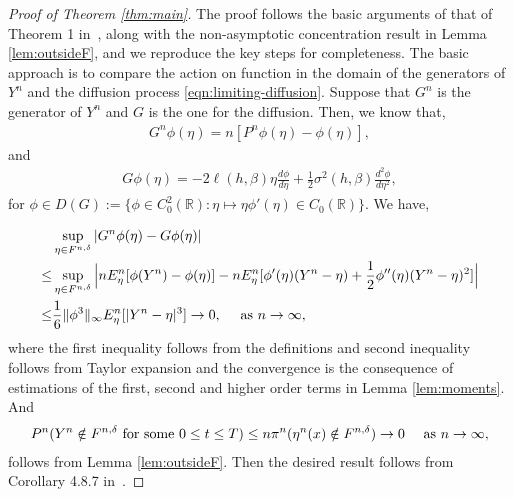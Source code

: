 \documentclass{amsart}
\newcommand{\Real}{\mathbb R}
\begin{document}
         
         \begin{proof}[Proof of Theorem \ref{thm:main}]
         	The proof follows the basic arguments of that of Theorem 1 in~\cite{bierkens2017}, along with the non-asymptotic concentration result in Lemma \ref{lem:outsideF}, and we reproduce the key steps for completeness. The basic approach is to compare the action on function in the domain of the generators of $Y^n$ and 
         	the diffusion process \eqref{eqn:limiting-diffusion}. Suppose that $G^n$ is the generator of $Y^n$ and $G$ is the one for the diffusion. Then, we know that,
         	\begin{align*}
         		G^n\phi(\eta)=n[P^n\phi(\eta)-\phi(\eta)],
         	\end{align*}
         and 
         \begin{align*}
         	G\phi(\eta)=-2\ell(h,\beta)\eta \frac{d\phi}{d\eta}+\frac12\sigma^2(h,\beta) \frac{d^2\phi}{d\eta^2},
         \end{align*}
     for $\phi\in D(G):=\{ \phi\in C_0^2(\Real):\eta\mapsto \eta\phi'(\eta)\in C_0(\Real)\}$. We have,

         	\begin{align*}
         		&\sup_{\eta\in F^{n, \delta}} |G^n \phi(\eta) -G\phi(\eta) |\\
         		\le & \sup_{\eta\in F^{n, \delta}}\Big| n E^n_\eta [\phi(Y^n)-\phi(\eta)]-n E^n_\eta[\phi'(\eta)(Y^n-\eta) +\frac12\phi''(\eta)(Y^n-\eta)^2]   \Big|\\ \le & \frac{1}{6}\|\phi^3\|_\infty E^n_\eta[|Y^n-\eta|^3]
         		\rightarrow 0, \quad \hbox { as } n\rightarrow \infty,
         	\end{align*}
         	where the first inequality follows from the definitions and second inequality follows from Taylor expansion and the convergence is the consequence of estimations of the first, second and higher order terms in Lemma \ref{lem:moments}. And 
         	\begin{align*}
         		P^n(Y^n \notin F^{n, \delta} \hbox{ for some } 0\le t\le T) \le n \pi^n (\eta^n(x) \notin F^{n, \delta}) \rightarrow 0\quad \hbox { as } n\rightarrow \infty,
         	\end{align*}
         	follows from Lemma \ref{lem:outsideF}. Then the desired result follows from  Corollary 4.8.7 in~\cite{ethier2009markov}.
         \end{proof}
         
         
         
         
         
         
         
         
         
         
         
         
     
\end{document}
